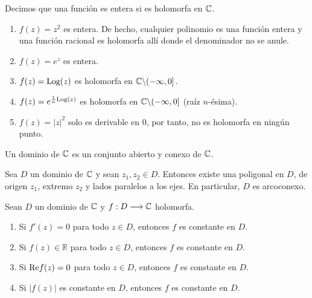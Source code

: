 \begin{defi}
    Decimos que una función es entera si es holomorfa en $\mathbb{C}$.
\end{defi}

\begin{ejemplo}
    \begin{enumerate}
        \item $f(z) = z^2$ es entera. De hecho, cualquier polinomio es una función entera y una función racional es holomorfa allí donde el denominador no se anule.
        \item $f(z)= e^z$ es entera.
        \item $f(z) = \text{Log}(z)$ es holomorfa en $\mathbb{C} \backslash (-\infty,0]$.
        \item $f(z) = e^{\frac{1}{n}\text{Log}(z)}$ es  holomorfa en $\mathbb{C} \backslash (-\infty,0]$ (raíz $n$-ésima).
        \item $f(z) = |z|^2$ solo es derivable en $0$, por tanto, no es holomorfa en ningún punto.
    \end{enumerate}
\end{ejemplo}

\begin{defi}
    Un dominio de $\mathbb{C}$ es un conjunto abierto y conexo de $\mathbb{C}$.
\end{defi}
\begin{prop}
    Sea $D$ un dominio de $\mathbb{C}$ y sean $z_1,z_2 \in D$. Entonces existe una poligonal en $D$, de origen $z_1$, extremo $z_2$ y lados paralelos a los ejes. En particular, $D$ es arcoconexo.
\end{prop}

\begin{teo}
    Sean $D$ un dominio de $\mathbb{C}$ y $f: D \longrightarrow \mathbb{C}$ holomorfa.
    \begin{enumerate}
        \item Si $f'(z) = 0$ para todo $z \in D$, entonces $f$ es constante en $D$.
        \item Si $f(z) \in \mathbb{R}$ para todo $z \in D$, entonces $f$ es constante en $D$.
        \item Si $\text{Re} f(z) = 0$ para todo $z \in D$, entonces $f$ es constante en $D$.
        \item Si $|f(z)|$ es constante en $D$, entonces $f$ es constante en $D$.
    \end{enumerate}
\end{teo}

